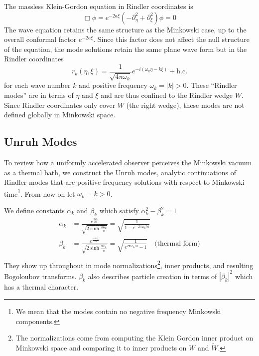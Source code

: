 \documentclass[12pt,a4paper]{article}
\begin{document}
The massless Klein-Gordon equation in Rindler coordinates is
\begin{equation}
  \Box \phi = e^{-2a \xi}(-\partial_\eta^2 + \partial_\xi^2) \phi = 0
\end{equation}
The wave equation retains the same structure as the Minkowski case, up to the overall conformal factor $e^{-2a\xi}$. Since this factor does not affect the null structure of the equation, the mode solutions retain the same plane wave form but in the Rindler coordinates
\begin{equation}
 r_k(\eta,\xi) = \frac{1}{\sqrt{4 \pi \omega_k}} e^{-i(\omega_k \eta -k \xi)} + \text{h.c.}
\end{equation}
for each wave number $k$ and positive frequency $\omega_k = |k| > 0$.  These ``Rindler modes'' are in terms of $\eta$ and $\xi$ and are thus confined to the Rindler wedge $W$.  Since Rindler coordinates only cover $W$ (the right wedge), these modes are not defined globally in Minkowski space.

\subsection{Unruh Modes}
To review how a uniformly accelerated observer perceives the Minkowski vacuum as a thermal bath, we construct the Unruh modes\cite{unruh1976notes}, analytic continuations of Rindler modes that are positive-frequency solutions with respect to Minkowski time\footnote{We mean that the modes contain no negative frequency Minkowski components.}. From now on let $\omega_k = k > 0$.

We define constants $\alpha_k$ and $\beta_k$ which satisfy $\alpha_k^2 - \beta_k^2 = 1$
\begin{equation}
  \begin{aligned}
    \alpha_k &= \frac{e^{\frac{\pi\omega_k}{2a}}}{\sqrt{2 \sinh \frac{\pi \omega_k}{a}}} = \sqrt{\frac{1}{1 - e^{-2\pi\omega_k / a}}}  \\
    \beta_k &= \frac{e^{\frac{-\pi\omega_k}{2a}}}{\sqrt{2 \sinh \frac{\pi \omega_k}{a}}} = \sqrt{\frac{1}{e^{2\pi\omega_k / a} - 1}} \quad \text{(thermal form)} \\
  \end{aligned}
  \label{alpha_beta}
\end{equation}
They show up throughout in mode normalizations\footnote{The normalizations come from computing the Klein Gordon inner product on Minkowski space and comparing it to inner products on $W$ and $\widetilde{W}$.}, inner products, and resulting Bogoloubov transforms. $\beta_k$ also describes particle creation in terms of $|\beta_k|^2$ which has a thermal character.
\end{document}
